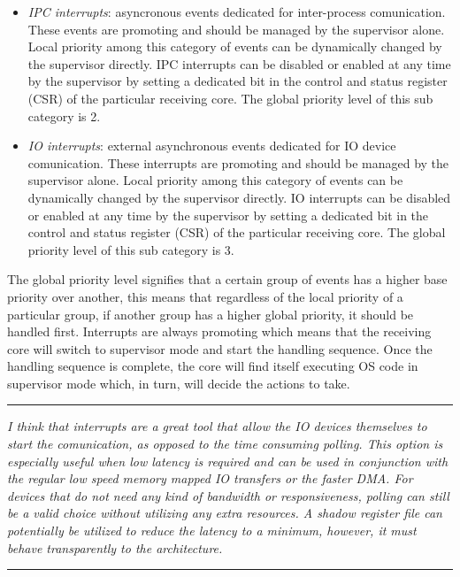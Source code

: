 \documentclass{article}
\begin{document}
            \begin{itemize}

                \item \textit{IPC interrupts}: asyncronous events dedicated for inter-process comunication. These events are promoting and should be managed by the supervisor alone. Local priority among this category of events can be dynamically changed by the supervisor directly. IPC interrupts can be disabled or enabled at any time by the supervisor by setting a dedicated bit in the control and status register (CSR) of the particular receiving core. The global priority level of this sub category is 2.
                \item \textit{IO interrupts}: external asynchronous events dedicated for IO device comunication. These interrupts are promoting and should be managed by the supervisor alone. Local priority among this category of events can be dynamically changed by the supervisor directly. IO interrupts can be disabled or enabled at any time by the supervisor by setting a dedicated bit in the control and status register (CSR) of the particular receiving core. The global priority level of this sub category is 3.

            \end{itemize}

            The global priority level signifies that a certain group of events has a higher base priority over another, this means that regardless of the local priority of a particular group, if another group has a higher global priority, it should be handled first. Interrupts are always promoting which means that the receiving core will switch to supervisor mode and start the handling sequence. Once the handling sequence is complete, the core will find itself executing OS code in supervisor mode which, in turn, will decide the actions to take.


        \par\noindent\rule{\textwidth}{0.4pt}
        \textit{I think that interrupts are a great tool that allow the IO devices themselves to start the comunication, as opposed to the time consuming polling. This option is especially useful when low latency is required and can be used in conjunction with the regular low speed memory mapped IO transfers or the faster DMA. For devices that do not need any kind of bandwidth or responsiveness, polling can still be a valid choice without utilizing any extra resources. A shadow register file can potentially be utilized to reduce the latency to a minimum, however, it must behave transparently to the architecture.}
        \par\noindent\rule{\textwidth}{0.4pt}
\end{document}
